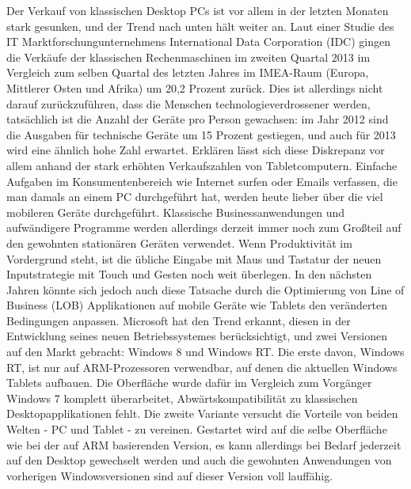 \documentclass[a4paper,bibtotoc,oneside]{scrbook}
\begin{document}
Der Verkauf von klassischen Desktop PCs ist vor allem  in der letzten Monaten stark gesunken, und der Trend nach unten hält weiter an. Laut einer Studie des IT Marktforschungunternehmens International Data Corporation (IDC) gingen die Verkäufe der klassischen Rechenmaschinen im zweiten Quartal 2013 im Vergleich zum selben Quartal des letzten Jahres im IMEA-Raum (Europa, Mittlerer Osten und Afrika) um 20,2 Prozent zurück.
\newline
Dies ist allerdings nicht darauf zurückzuführen, dass die Menschen technologieverdrossener werden, tatsächlich ist die Anzahl der Geräte pro Person gewachsen: im Jahr 2012 sind die Ausgaben für technische Geräte um 15 Prozent gestiegen, und auch für 2013 wird eine ähnlich hohe Zahl erwartet.
\newline
Erklären lässt sich diese Diskrepanz vor allem anhand der stark erhöhten Verkaufszahlen von Tabletcomputern. Einfache Aufgaben im Konsumentenbereich wie Internet surfen oder Emails verfassen, die man damals an einem PC durchgeführt hat, werden heute lieber über die viel mobileren Geräte durchgeführt.
\newline
Klassische Businessanwendungen und aufwändigere Programme werden allerdings derzeit immer noch zum Großteil auf den gewohnten stationären Geräten verwendet. Wenn Produktivität im Vordergrund steht, ist die übliche Eingabe mit Maus und Tastatur der neuen Inputstrategie mit Touch und Gesten noch weit überlegen. \cite{idc13}
\newline
\newline
In den nächsten Jahren könnte sich jedoch auch diese Tatsache durch die Optimierung von Line of Business (LOB) Applikationen auf mobile Geräte wie Tablets den veränderten Bedingungen anpassen.
\newline
Microsoft hat den Trend erkannt, diesen in der Entwicklung seines neuen Betriebssystemes  berücksichtigt, und zwei Versionen auf den Markt gebracht: Windows 8 und Windows RT.
Die erste davon, Windows RT, ist nur auf ARM-Prozessoren verwendbar, auf denen die aktuellen Windows Tablets aufbauen. Die Oberfläche wurde dafür im Vergleich zum Vorgänger Windows 7 komplett überarbeitet, Abwärtskompatibilität zu klassischen Desktopapplikationen fehlt.
\newline
Die zweite Variante versucht die Vorteile von beiden Welten - PC und Tablet - zu vereinen.
Gestartet wird auf die selbe Oberfläche wie bei der auf ARM basierenden Version, es kann allerdings bei Bedarf jederzeit auf den Desktop gewechselt werden und auch die gewohnten Anwendungen von vorherigen Windowsversionen sind auf dieser Version voll lauffähig.
\end{document}
